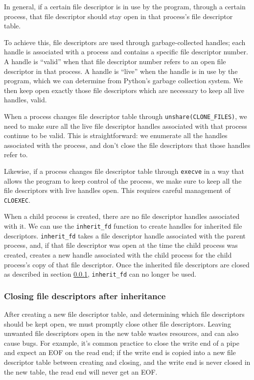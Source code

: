 \documentclass[letterpaper,twocolumn,10pt]{article}
\begin{document}
In general, if a certain file descriptor is in use by the program,
through a certain process,
that file descriptor should stay open in that process's file descriptor table.

To achieve this, file descriptors are used through garbage-collected handles;
each handle is associated with a process and contains a specific file descriptor number.
A handle is ``valid''
when that file descriptor number refers to an open file descriptor in that process.
A handle is ``live''
when the handle is in use by the program, which we can determine
from Python's garbage collection system.
We then keep open exactly those file descriptors which are necessary to keep all live handles, valid.

When a process changes file descriptor table through \verb|unshare(CLONE_FILES)|,
we need to make sure all the live file descriptor handles associated with that process continue to be valid.
This is straightforward:
we enumerate all the handles associated with the process,
and don't close the file descriptors that those handles refer to.

Likewise, if a process changes file descriptor table through \texttt{execve}
in a way that allows the program to keep control of the process,
we make sure to keep all the file descriptors with live handles open.
This requires careful management of \texttt{CLOEXEC}.

When a child process is created,
there are no file descriptor handles associated with it.
We can use the \verb|inherit_fd| function to create handles for inherited file descriptors.
\verb|inherit_fd| takes a file descriptor handle associated with the parent process,
and, if that file descriptor was open at the time the child process was created,
creates a new handle associated with the child process
for the child process's copy of that file descriptor.
Once the inherited file descriptors are closed as described in section \ref{cloexec},
\verb|inherit_fd| can no longer be used.
\subsubsection{Closing file descriptors after inheritance}\label{cloexec}
After creating a new file descriptor table,
and determining which file descriptors should be kept open,
we must promptly close other file descriptors.
Leaving unwanted file descriptors open in the new table wastes resources,
and can also cause bugs.
For example, it's common practice to close the write end of a pipe
and expect an EOF on the read end;
if the write end is copied into a new file descriptor table between creating and closing,
and the write end is never closed in the new table,
the read end will never get an EOF.
\end{document}
